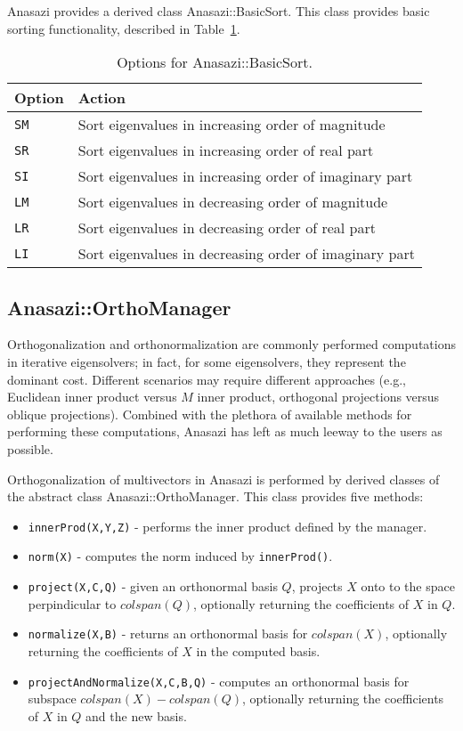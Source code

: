 Anasazi provides a derived class Anasazi::BasicSort.  This class provides basic sorting
functionality, described in Table~\ref{tab:anasazi:sm}.

\begin{table}
\begin{center}
\begin{tabular}{| p{2cm} l |}
\hline
Option & Action \\
\hline
{\tt SM} & Sort eigenvalues in increasing order of magnitude \\
{\tt SR} & Sort eigenvalues in increasing order of real part \\
{\tt SI} & Sort eigenvalues in increasing order of imaginary part \\
{\tt LM} & Sort eigenvalues in decreasing order of magnitude \\
{\tt LR} & Sort eigenvalues in decreasing order of real part \\
{\tt LI} & Sort eigenvalues in decreasing order of imaginary part \\
\hline
\end{tabular}
\caption{Options for Anasazi::BasicSort.}
\label{tab:anasazi:sm}
\end{center}
\end{table}


\subsection{Anasazi::OrthoManager}
\label{sec:anasazi:ortho}

Orthogonalization and orthonormalization are commonly performed computations in iterative
eigensolvers; in fact, for some eigensolvers, they represent the dominant cost.  Different
scenarios may require different approaches (e.g., Euclidean inner product versus $M$ inner
product, orthogonal projections versus oblique projections).  Combined with the plethora
of available methods for performing these computations, Anasazi has left as much leeway to
the users as possible.

Orthogonalization of multivectors in Anasazi is performed by derived classes of
the abstract class Anasazi::OrthoManager. This class provides five methods:
\begin{itemize}
  \item \verb!innerProd(X,Y,Z)! - performs the inner product defined by the manager.
  \item \verb!norm(X)! - computes the norm induced by \verb!innerProd()!.
  \item \verb!project(X,C,Q)! - given an orthonormal basis $Q$, projects $X$ onto to the space perpindicular to
    $colspan(Q)$, optionally returning the coefficients of $X$ in $Q$.
  \item \verb!normalize(X,B)! - returns an orthonormal basis for $colspan(X)$, optionally
    returning the coefficients of $X$ in the computed basis.
  \item \verb!projectAndNormalize(X,C,B,Q)! - computes an orthonormal basis for subspace
    $colspan(X) - colspan(Q)$, optionally returning the coefficients of
    $X$ in $Q$ and the new basis.
\end{itemize}

